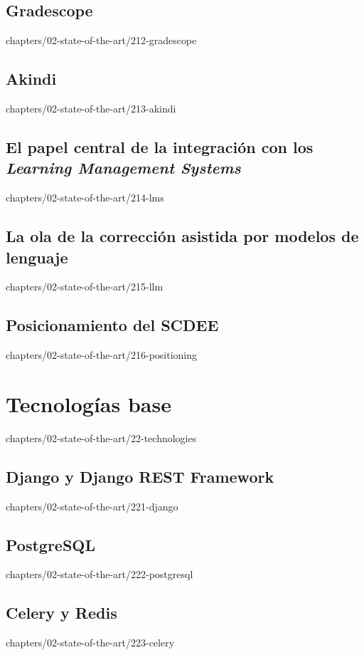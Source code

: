 \documentclass[epsbased,tfg,covers,final,printable,extendedindex,%
               firstnumbered,lof,lot, loc]{tfgtfmthesisuam}
\begin{document}
    \subsection{Gradescope\label{SS:SOTA-GRADESCOPE}}%
                {chapters/02-state-of-the-art/212-gradescope}
    \subsection{Akindi\label{SS:SOTA-AKINDI}}%
                {chapters/02-state-of-the-art/213-akindi}
    \subsection[Integración con los LMS]%
                {El papel central de la integración con los \emph{Learning
                 Management Systems}\label{SS:SOTA-LMS}}%
                {chapters/02-state-of-the-art/214-lms}
    \subsection[Corrección asistida por modelos de lenguaje]%
                {La ola de la corrección asistida por modelos de
                 lenguaje\label{SS:SOTA-LLM}}%
                {chapters/02-state-of-the-art/215-llm}
    \subsection{Posicionamiento del SCDEE\label{SS:SOTA-POSITIONING}}%
                {chapters/02-state-of-the-art/216-positioning}
  \section{Tecnologías base\label{SEC:SOTA-TECH}}%
          {chapters/02-state-of-the-art/22-technologies}
    \subsection[Django y DRF]%
                {Django y Django {REST} Framework\label{SS:SOTA-DJANGO}}%
                {chapters/02-state-of-the-art/221-django}
    \subsection{PostgreSQL\label{SS:SOTA-POSTGRES}}%
                {chapters/02-state-of-the-art/222-postgresql}
    \subsection{Celery y Redis\label{SS:SOTA-CELERY}}%
                {chapters/02-state-of-the-art/223-celery}
\end{document}
